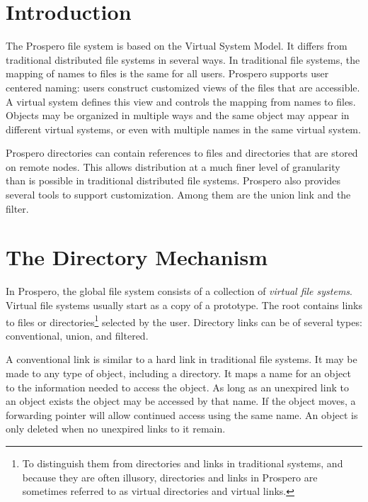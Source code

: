 \tableofcontents

\section{Introduction}

The Prospero file system is based on the Virtual System Model.
\nocite{nfclosure,vsmldos}
It differs from traditional distributed file systems in several ways.
In traditional file systems, the mapping of names to files is the same
for all users.  Prospero supports user centered naming: users
construct customized views of the files that are accessible.  A
virtual system defines this view and controls the mapping from names
to files.  Objects may be organized in multiple ways and the same
object may appear in different virtual systems, or even with multiple
names in the same virtual system.

Prospero directories can contain references to files and directories
that are stored on remote nodes.  This allows distribution at a much
finer level of granularity than is possible in traditional distributed
file systems.  Prospero also provides several tools to support
customization.  Among them are the union link and the filter.

\section{The Directory Mechanism}

{In \samepage Prospero, the global file system consists of a collection of {\it
virtual file systems}.  Virtual file systems usually start as a copy
of a prototype.  The root contains links to files or
directories\footnote{To distinguish them from directories and links in
traditional systems, and because they are often illusory, directories
and links in Prospero are sometimes referred to as virtual directories and
virtual links.} selected by the user.  Directory links can be of
several types: conventional, union, and filtered.}

A conventional link is similar to a hard link in traditional file
systems.  It may be made to any type of object, including a directory.
It maps a name for an object to the information needed to access the
object.  As long as an unexpired link to an object exists the object
may be accessed by that name.  If the object moves, a forwarding
pointer will allow continued access using the same name.  An object is
only deleted when no unexpired links to it remain.

